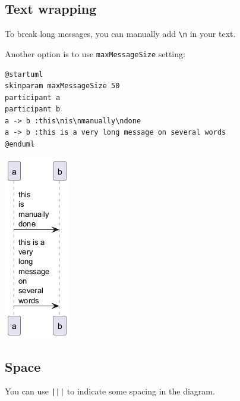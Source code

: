 \subsection{Text wrapping}


To break long messages, you can manually add \texttt{\textbackslash n} in your text.


Another option is to use \texttt{maxMessageSize} setting:


\begin{verbatim}
@startuml
skinparam maxMessageSize 50
participant a
participant b
a -> b :this\nis\nmanually\ndone
a -> b :this is a very long message on several words
@enduml
\end{verbatim}
\begin{center}
\includegraphics[scale=0.60]{imgw/img-e1dfc5c0f251a2231037cc984b546a1b.png}
\end{center}
%
%
\subsection{Space}




You can use \texttt{|||} to indicate some spacing in the diagram.


